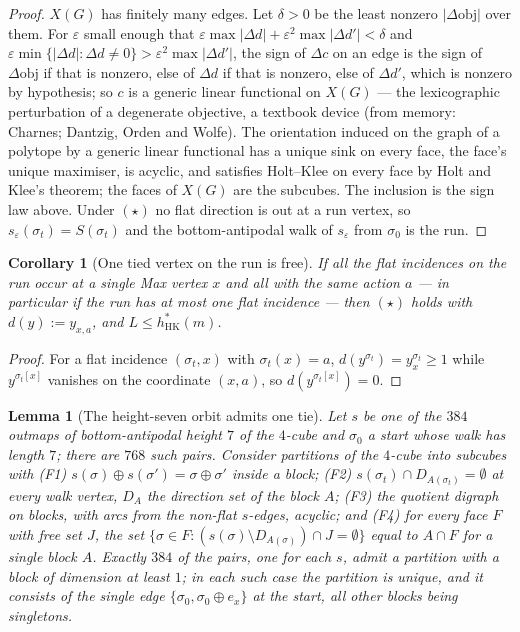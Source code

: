\documentclass[11pt]{article}
\theoremstyle{plain}
\newtheorem{lemma}[theorem]{Lemma}
\newtheorem{corollary}[theorem]{Corollary}
\theoremstyle{definition}
\begin{document}
\begin{proof}
$X(G)$ has finitely many edges. Let $\delta>0$ be the least nonzero
$|\Delta\mathrm{obj}|$ over them. For $\varepsilon$ small enough that
$\varepsilon\max|\Delta d|+\varepsilon^{2}\max|\Delta d'|<\delta$ and
$\varepsilon\min\{|\Delta d|:\Delta d\ne0\}>\varepsilon^{2}\max|\Delta d'|$,
the sign of $\Delta c$ on an edge is the sign of $\Delta\mathrm{obj}$ if
that is nonzero, else of $\Delta d$ if that is nonzero, else of
$\Delta d'$, which is nonzero by hypothesis; so $c$ is a generic linear
functional on $X(G)$ --- the lexicographic perturbation of a degenerate
objective, a textbook device (from memory: Charnes; Dantzig, Orden and
Wolfe). The orientation induced on the graph of a polytope by a generic
linear functional has a unique sink on every face, the face's unique
maximiser, is acyclic, and satisfies Holt--Klee on every face by Holt and
Klee's theorem; the faces of $X(G)$ are the subcubes. The inclusion is
the sign law above. Under $(\star)$ no flat direction is out at a run
vertex, so $s_\varepsilon(\sigma_t)=S(\sigma_t)$ and the
bottom-antipodal walk of $s_\varepsilon$ from $\sigma_0$ is the run.
\end{proof}

\begin{corollary}[One tied vertex on the run is free]\label{cor:one-tie}
If all the flat incidences on the run occur at a single Max vertex $x$
and all with the same action $a$ --- in particular if the run has at
most one flat incidence --- then $(\star)$ holds with $d(y):=y_{x,a}$,
and $L\le h^{\ast}_{\mathrm{HK}}(m)$.
\end{corollary}

\begin{proof}
For a flat incidence $(\sigma_t,x)$ with $\sigma_t(x)=a$,
$d(y^{\sigma_t})=y^{\sigma_t}_{x}\ge1$ while $y^{\sigma_t[x]}$ vanishes
on the coordinate $(x,a)$, so $d(y^{\sigma_t[x]})=0$.
\end{proof}

\begin{lemma}[The height-seven orbit admits one tie]\label{lem:seven-flat}
Let $s$ be one of the $384$ outmaps of bottom-antipodal height $7$ of
the $4$-cube and $\sigma_0$ a start whose walk has length $7$; there are
$768$ such pairs. Consider partitions of the $4$-cube into subcubes with
(F1) $s(\sigma)\oplus s(\sigma')=\sigma\oplus\sigma'$ inside a block;
(F2) $s(\sigma_t)\cap D_{A(\sigma_t)}=\emptyset$ at every walk vertex,
$D_A$ the direction set of the block $A$; (F3) the quotient digraph on
blocks, with arcs from the non-flat $s$-edges, acyclic; and (F4) for
every face $F$ with free set $J$, the set
$\{\sigma\in F:(s(\sigma)\setminus D_{A(\sigma)})\cap J=\emptyset\}$ equal
to $A\cap F$ for a single block $A$. Exactly $384$ of the pairs, one for
each $s$, admit a partition with a block of dimension at least $1$; in
each such case the partition is unique, and it consists of the single
edge $\{\sigma_0,\sigma_0\oplus e_x\}$ at the \emph{start}, all other
blocks being singletons.
\end{lemma}
\end{document}
